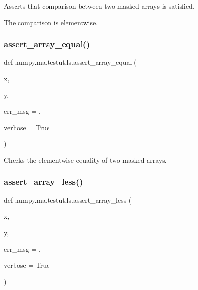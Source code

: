 \begin{DoxyVerb}Asserts that comparison between two masked arrays is satisfied.

The comparison is elementwise.\end{DoxyVerb}
 \mbox{\label{namespacenumpy_1_1ma_1_1testutils_a3fc5e4393ebc1781a31f9a7300fedb6c}} 
\subsubsection{\texorpdfstring{assert\+\_\+array\+\_\+equal()}{assert\_array\_equal()}}
{\footnotesize\ttfamily def numpy.\+ma.\+testutils.\+assert\+\_\+array\+\_\+equal (\begin{DoxyParamCaption}\item[{}]{x,  }\item[{}]{y,  }\item[{}]{err\+\_\+msg = {\ttfamily \textquotesingle{}\textquotesingle{}},  }\item[{}]{verbose = {\ttfamily True} }\end{DoxyParamCaption})}

\begin{DoxyVerb}Checks the elementwise equality of two masked arrays.\end{DoxyVerb}
 \mbox{\label{namespacenumpy_1_1ma_1_1testutils_a589669f9fd4d77f178c9d40186ba6858}} 
\subsubsection{\texorpdfstring{assert\+\_\+array\+\_\+less()}{assert\_array\_less()}}
{\footnotesize\ttfamily def numpy.\+ma.\+testutils.\+assert\+\_\+array\+\_\+less (\begin{DoxyParamCaption}\item[{}]{x,  }\item[{}]{y,  }\item[{}]{err\+\_\+msg = {\ttfamily \textquotesingle{}\textquotesingle{}},  }\item[{}]{verbose = {\ttfamily True} }\end{DoxyParamCaption})}

